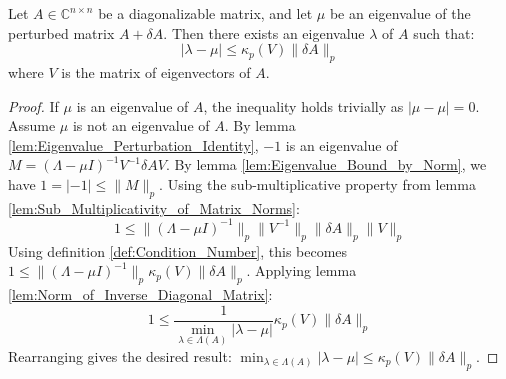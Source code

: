 \begin{theorem}
    \label{thm:Bauer-Fike}
    Let $A \in \mathbb{C}^{n \times n}$ be a diagonalizable matrix, and let $\mu$ be an eigenvalue of the perturbed matrix $A + \delta A$. Then there exists an eigenvalue $\lambda$ of $A$ such that:
    \[ |\lambda - \mu| \leq \kappa_p(V) \|\delta A\|_p \]
    where $V$ is the matrix of eigenvectors of $A$.
\end{theorem}

\begin{proof}
    If $\mu$ is an eigenvalue of $A$, the inequality holds trivially as $|\mu - \mu| = 0$.
    Assume $\mu$ is not an eigenvalue of $A$. By lemma \ref{lem:Eigenvalue_Perturbation_Identity}, $-1$ is an eigenvalue of $M = (\Lambda - \mu I)^{-1} V^{-1} \delta A V$.
    By lemma \ref{lem:Eigenvalue_Bound_by_Norm}, we have $1 = |-1| \leq \|M\|_p$.
    Using the sub-multiplicative property from lemma \ref{lem:Sub_Multiplicativity_of_Matrix_Norms}:
    \[ 1 \leq \|(\Lambda - \mu I)^{-1}\|_p \|V^{-1}\|_p \|\delta A\|_p \|V\|_p \]
    Using definition \ref{def:Condition_Number}, this becomes $1 \leq \|(\Lambda - \mu I)^{-1}\|_p \kappa_p(V) \|\delta A\|_p$.
    Applying lemma \ref{lem:Norm_of_Inverse_Diagonal_Matrix}:
    \[ 1 \leq \frac{1}{\min_{\lambda \in \Lambda(A)} |\lambda - \mu|} \kappa_p(V) \|\delta A\|_p \]
    Rearranging gives the desired result: $\min_{\lambda \in \Lambda(A)} |\lambda - \mu| \leq \kappa_p(V) \|\delta A\|_p$.
\end{proof}